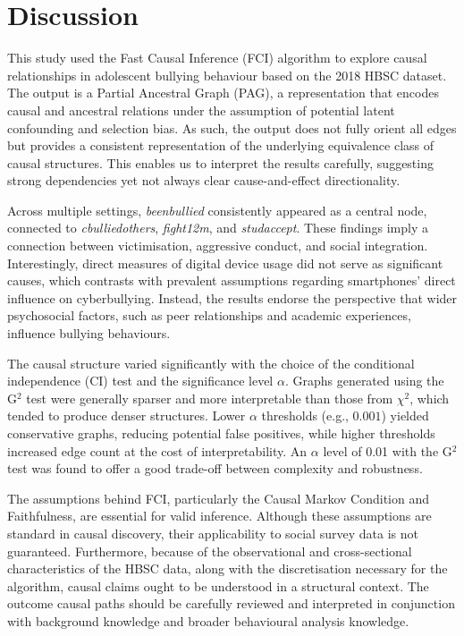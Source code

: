 \documentclass[main.tex]{subfiles}
\begin{document}
\section{Discussion}

This study used the Fast Causal Inference (FCI) algorithm to explore causal relationships in adolescent bullying behaviour based on the 2018 HBSC dataset. The output is a Partial Ancestral Graph (PAG), a representation that encodes causal and ancestral relations under the assumption of potential latent confounding and selection bias. As such, the output does not fully orient all edges but provides a consistent representation of the underlying equivalence class of causal structures. This enables us to interpret the results carefully, suggesting strong dependencies yet not always clear cause-and-effect directionality.

Across multiple settings, \textit{beenbullied} consistently appeared as a central node, connected to \textit{cbulliedothers}, \textit{fight12m}, and \textit{studaccept}. These findings imply a connection between victimisation, aggressive conduct, and social integration. Interestingly, direct measures of digital device usage did not serve as significant causes, which contrasts with prevalent assumptions regarding smartphones' direct influence on cyberbullying. Instead, the results endorse the perspective that wider psychosocial factors, such as peer relationships and academic experiences, influence bullying behaviours.

The causal structure varied significantly with the choice of the conditional independence (CI) test and the significance level $\alpha$. Graphs generated using the G$^2$ test were generally sparser and more interpretable than those from $\chi^2$, which tended to produce denser structures. Lower $\alpha$ thresholds (e.g., $0.001$) yielded conservative graphs, reducing potential false positives, while higher thresholds increased edge count at the cost of interpretability. An $\alpha$ level of 0.01 with the G$^2$ test was found to offer a good trade-off between complexity and robustness.

The assumptions behind FCI, particularly the Causal Markov Condition and Faithfulness, are essential for valid inference. Although these assumptions are standard in causal discovery, their applicability to social survey data is not guaranteed. Furthermore, because of the observational and cross-sectional characteristics of the HBSC data, along with the discretisation necessary for the algorithm, causal claims ought to be understood in a structural context.  The outcome causal paths should be carefully reviewed and interpreted in conjunction with background knowledge and broader behavioural analysis knowledge.
\end{document}
